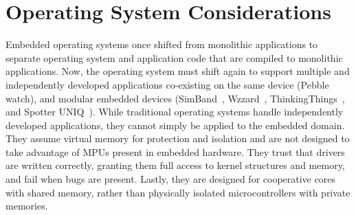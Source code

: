 \section{Operating System Considerations}
\label{os-considerations}

Embedded operating systems once shifted from monolithic applications to separate
operating system and application code that are compiled to monolithic
applications. Now, the operating system must shift again to support multiple and
independently developed applications co-existing on the same device
(Pebble~\cite{pebble} watch), and modular embedded devices
(SimBand~\cite{simband}, Wzzard~\cite{wzzard},
ThinkingThings~\cite{thinkingthings}, and Spotter UNIQ~\cite{spotteruniq}).
While traditional operating systems handle independently developed applications,
they cannot simply be applied to the embedded domain. They assume virtual memory
for protection and isolation and are not designed to take advantage of MPUs
present in embedded hardware. They trust that drivers are written correctly,
granting them full access to kernel structures and memory, and fail when bugs
are present. Lastly, they are designed for cooperative cores with shared memory,
rather than physically isolated microcontrollers with private memories.

%


